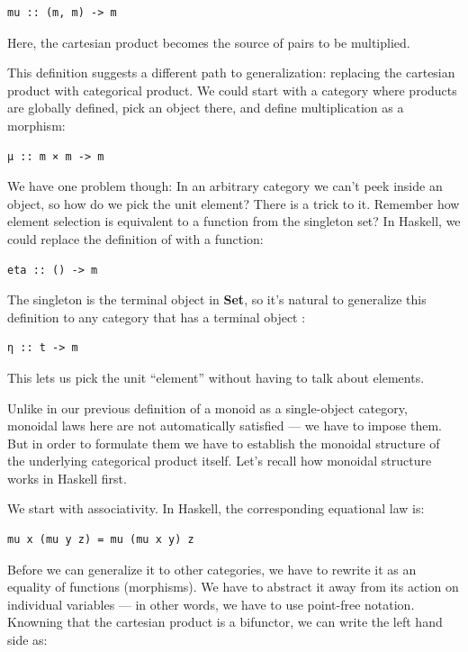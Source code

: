 \begin{verbatim}
mu :: (m, m) -> m
\end{verbatim}

Here, the cartesian product  becomes the source of pairs
to be multiplied.

This definition suggests a different path to generalization: replacing
the cartesian product with categorical product. We could start with a
category where products are globally defined, pick an object 
there, and define multiplication as a morphism:

\begin{verbatim}
μ :: m × m -> m
\end{verbatim}

We have one problem though: In an arbitrary category we can't peek
inside an object, so how do we pick the unit element? There is a trick
to it. Remember how element selection is equivalent to a function from
the singleton set? In Haskell, we could replace the definition of
 with a function:

\begin{verbatim}
eta :: () -> m
\end{verbatim}

The singleton is the terminal object in \textbf{Set}, so it's natural to
generalize this definition to any category that has a terminal object
:

\begin{verbatim}
η :: t -> m
\end{verbatim}

This lets us pick the unit ``element'' without having to talk about
elements.

Unlike in our previous definition of a monoid as a single-object
category, monoidal laws here are not automatically satisfied --- we have
to impose them. But in order to formulate them we have to establish the
monoidal structure of the underlying categorical product itself. Let's
recall how monoidal structure works in Haskell first.

We start with associativity. In Haskell, the corresponding equational
law is:

\begin{verbatim}
mu x (mu y z) = mu (mu x y) z
\end{verbatim}

Before we can generalize it to other categories, we have to rewrite it
as an equality of functions (morphisms). We have to abstract it away
from its action on individual variables --- in other words, we have to
use point-free notation. Knowning that the cartesian product is a
bifunctor, we can write the left hand side as:

